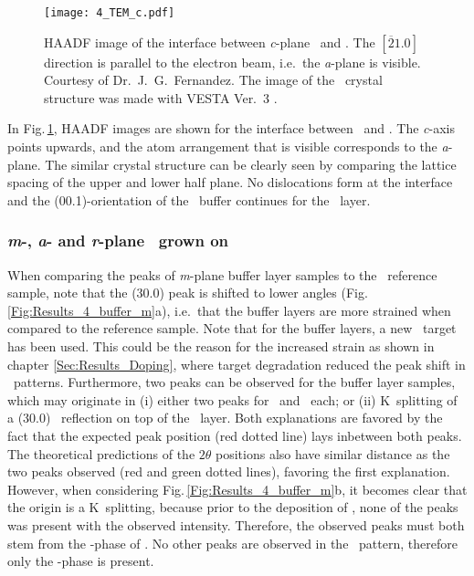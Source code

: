 \begin{figure}
    \centering
    \texttt{[image: 4\_TEM\_c.pdf]}
    \caption{
        \acrshort{HAADF} image of the interface between \textit{c}-plane \cro\ and \agao.
        The $[\overline{2}1.0]$ direction is parallel to the electron beam, i.e.\ the \textit{a}-plane is visible.
        Courtesy of Dr.\ J.\ G.\  Fernandez.
        The image of the \agao\ crystal structure was made with VESTA Ver.~3 \cite{momma2011}.
    }
    \label{Fig:Results_4_TEM_c}
\end{figure}
In Fig.\,\ref{Fig:Results_4_TEM_c}, \acrshort{HAADF} images are shown for the interface between \agao\ and \cro.
The \textit{c}-axis points upwards, and the atom arrangement that is visible corresponds to the \textit{a}-plane.
The similar crystal structure can be clearly seen by comparing the lattice spacing of the upper and lower half plane.
No dislocations form at the interface and the (00.1)-orientation of the \cro\ buffer continues for the \gao\ layer.


\subsubsection*{\textit{m}-, \textit{a}- and \textit{r}-plane \texorpdfstring{\agao}{a-Ga2O3}\ grown on \texorpdfstring{\cro}
{Cr2O3}}


When comparing the peaks of \textit{m}-plane buffer layer samples to the \cro\ reference sample, note that the (30.0) peak is shifted to lower angles (Fig.\,\ref{Fig:Results_4_buffer_m}a), i.e.\ that the buffer layers are more strained when compared to the reference sample.
Note that for the buffer layers, a new \cro\ target has been used.
This could be the reason for the increased strain as shown in chapter \ref{Sec:Results_Doping}, where target degradation reduced the peak shift in \thetaomega\ patterns.
Furthermore, two peaks can be observed for the buffer layer samples, which may originate in (i) either two peaks for \cro\ and \agao\ each; or (ii) K\textalpha\ splitting of a (30.0) \agao\ reflection on top of the \cro\ layer.
Both explanations are favored by the fact that the expected peak position (red dotted line) lays inbetween both peaks.
The theoretical predictions of the $2\theta$ positions also have similar distance as the two peaks observed (red and green dotted lines), favoring the first explanation.
However, when considering Fig.\,\ref{Fig:Results_4_buffer_m}b, it becomes clear that the origin is a K\textalpha\ splitting, because prior to the deposition of \gao, none of the peaks was present with the observed intensity.
Therefore, the observed peaks must both stem from the \textalpha-phase of \gao.
No other peaks are observed in the \thetaomega\ pattern, therefore only the \textalpha-phase is present.

